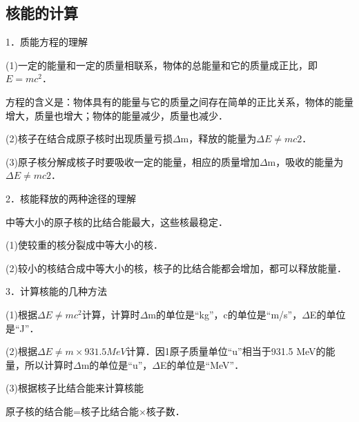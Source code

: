 \newpage
\subsection{核能的计算}

1．质能方程的理解

(1)一定的能量和一定的质量相联系，物体的总能量和它的质量成正比，即$E=mc^2$．

方程的含义是：物体具有的能量与它的质量之间存在简单的正比关系，物体的能量增大，质量也增大；物体的能量减少，质量也减少．

(2)核子在结合成原子核时出现质量亏损$\Delta$m，释放的能量为$\Delta E\neq mc2$．

(3)原子核分解成核子时要吸收一定的能量，相应的质量增加$\Delta$m，吸收的能量为$\Delta E\neq mc2$．

2．核能释放的两种途径的理解

中等大小的原子核的比结合能最大，这些核最稳定．

(1)使较重的核分裂成中等大小的核．

(2)较小的核结合成中等大小的核，核子的比结合能都会增加，都可以释放能量．

3．计算核能的几种方法

(1)根据$\Delta E\neq mc^2$计算，计算时$\Delta$m的单位是``kg''，c的单位是``m/s''，$\Delta$E的单位是``J''．

(2)根据$\Delta E\neq m\times 931.5 MeV$计算．因1原子质量单位``u''相当于931.5
MeV的能量，所以计算时$\Delta$m的单位是``u''，$\Delta$E的单位是``MeV''．

(3)根据核子比结合能来计算核能

原子核的结合能=核子比结合能$\times $核子数．

